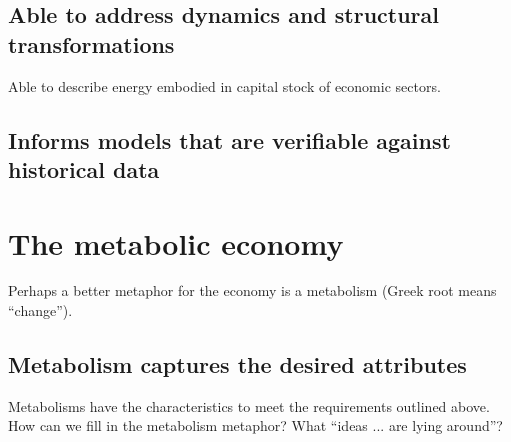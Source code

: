 \subsection{Able to address dynamics and structural transformations}
\label{sec:structure}

Able to describe energy embodied in capital stock of economic sectors.

\subsection{Informs models that are verifiable against historical data}
\label{sec:verifiable}

\section{The metabolic economy}
\label{sec:metabolic_economy}

Perhaps a better metaphor for the economy is a metabolism (Greek root means ``change''). 

\subsection{Metabolism captures the desired attributes}
\label{sec:metabolism_works}
     
Metabolisms have the characteristics to meet the requirements outlined above.
How can we fill in the metabolism metaphor? What ``ideas ... are lying around''?

